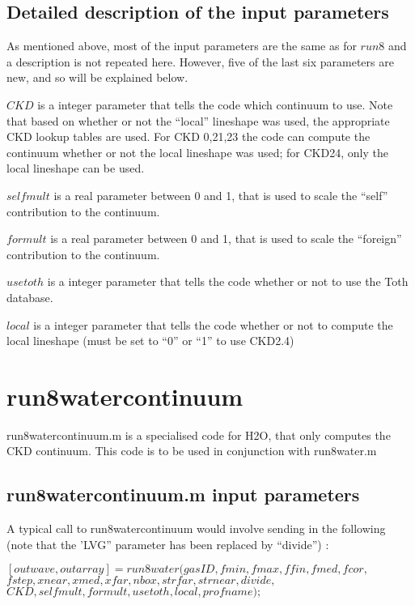 \documentclass[11pt]{article}
\begin{document}
\subsection{Detailed description of the input parameters}

As mentioned above, most of the input parameters are the same as for $run8$
and a description is not repeated here. However, five of the last six 
parameters are new, and so will be explained below.

$CKD$ is a integer parameter that tells the code which continuum to use. 
Note that based on whether or not the ``local'' lineshape was used, the 
appropriate CKD lookup tables are used. For CKD 0,21,23 the code can 
compute the continuum whether or not the local lineshape was used; for 
CKD24, only the local lineshape can be used.

$selfmult$ is a real parameter between 0 and 1, that is used to scale the
``self'' contribution to the continuum.

$formult$ is a real parameter between 0 and 1, that is used to scale the
``foreign'' contribution to the continuum.

$usetoth$ is a integer parameter that tells the code whether or not to use 
the Toth database.

$local$ is a integer parameter that tells the code whether or not to compute
the local lineshape (must be set to ``0'' or ``1'' to use CKD2.4)

\section{run8watercontinuum}

run8watercontinuum.m is a specialised code for H2O, that only computes the
CKD continuum. This code is to be used in conjunction with run8water.m

\subsection{run8watercontinuum.m input parameters}

A typical call to run8watercontinuum would involve sending in the following 
(note that the 'LVG'' parameter has been replaced by ``divide'') : 

$[outwave,outarray]=run8water(gasID,fmin,fmax,ffin,fmed,fcor,$\\
              $fstep,xnear,xmed,xfar,nbox,strfar,strnear,divide,$\\
              $CKD,selfmult,formult,usetoth,local,profname);$
\end{document}
